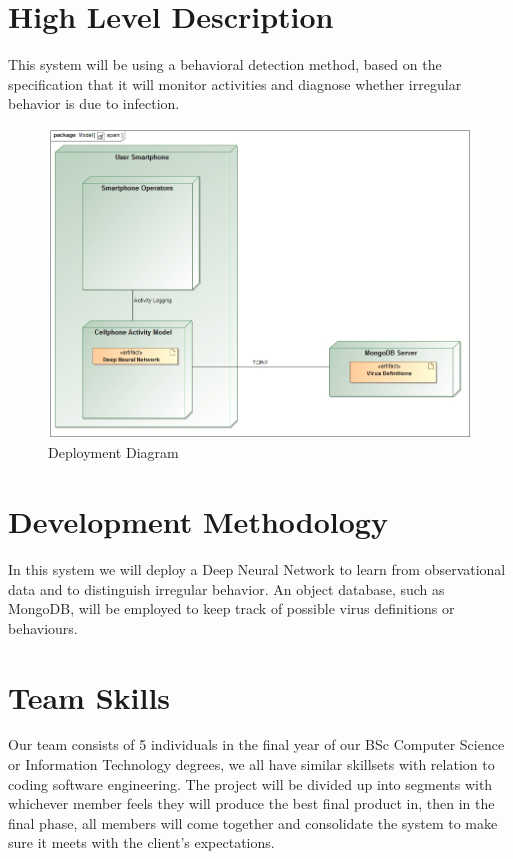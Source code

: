 \documentclass[12pt,a4paper]{article}
\begin{document}


\tableofcontents
\newpage

\section{High Level Description}
This system will be using a behavioral detection method, based on the specification that it will monitor activities and diagnose whether irregular behavior is due to infection.

\begin{figure}
    \includegraphics[width=\linewidth]{Images/spam.jpg}
    \caption{Deployment Diagram}
\end{figure}

\section{Development Methodology}
In this system we will deploy a Deep Neural Network to learn from observational data and to distinguish irregular behavior. An object database, such as MongoDB, will be employed to keep track of possible virus definitions or behaviours.

\section{Team Skills}
Our team consists of 5 individuals in the final year of our BSc Computer Science or Information Technology degrees, we all have similar skillsets with relation to coding software engineering. The project will be divided up into segments with whichever member feels they will produce the best final product in, then in the final phase, all members will come together and consolidate the system to make sure it meets with the client's expectations.
\end{document}
